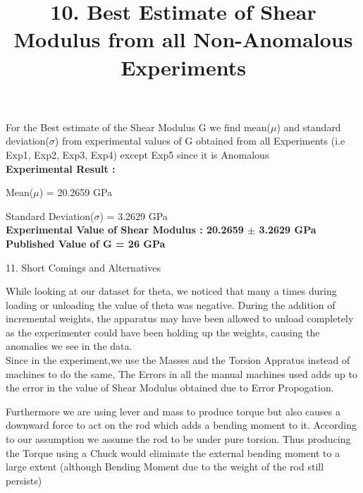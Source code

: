 \documentclass[12pt,a4paper]{article}	%
\title{10. Best Estimate of Shear Modulus from all Non-Anomalous Experiments}
\date{\vspace{-5ex}}	%
\begin{document}
\maketitle
\thispagestyle{empty}	%
\large
For the Best estimate of the Shear Modulus G we find mean($\mu$) and standard deviation($\sigma$) from experimental values of G obtained from all Experiments (i.e Exp1, Exp2, Exp3, Exp4) except Exp5 since it is Anomalous\\

\textbf{Experimental Result : }

Mean($\mu$) = 20.2659 GPa

Standard Deviation($\sigma$) = 3.2629 GPa\\

\textbf{Experimental Value of Shear Modulus : 20.2659 $\pm$ 3.2629 GPa} \\

\textbf{Published Value of G = 26 GPa}

\vspace{2cm}
\begin{center}
	{\LARGE 11. Short Comings and Alternatives}
\end{center}
\Large
While looking at our dataset for theta, we noticed that many a times during loading or unloading the value of theta was negative. During the addition of incremental weights, the apparatus may have been allowed to unload completely as the experimenter could have been holding up the weights, causing the anomalies we see in the data.\\

Since in the experiment,we use the Masses and the Torsion Appratus instead of machines to do the same, The Errors in all the manual machines used adds up to the error in the value of Shear Modulus obtained due to Error Propogation.\\
\thispagestyle{empty}	%
\pagebreak

Furthermore we are using lever and mass to produce torque but also causes a downward force to act on the rod which adds a bending moment to it. According to our assumption we assume the rod to be under pure torsion. Thus producing the Torque using a Chuck would eliminate the external bending moment to a large extent (although Bending Moment due to the weight of the rod still persists)\\
\end{document}
